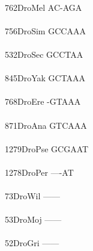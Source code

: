 \documentclass[11pt,twoside,reqno,a4paper]{article}
\begin{document}
{\\
762\hspace*{2\charwidth}DroMel	AC-AGA\\
\hspace*{5\charwidth}\hspace*{7\charwidth}\\
756\hspace*{2\charwidth}DroSim	GCCAAA\\
\hspace*{5\charwidth}\hspace*{7\charwidth}\\
532\hspace*{2\charwidth}DroSec	GCCTAA\\
\hspace*{5\charwidth}\hspace*{7\charwidth}\\
845\hspace*{2\charwidth}DroYak	GCTAAA\\
\hspace*{5\charwidth}\hspace*{7\charwidth}\\
768\hspace*{2\charwidth}DroEre	-GTAAA\\
\hspace*{5\charwidth}\hspace*{7\charwidth}\\
871\hspace*{2\charwidth}DroAna	GTCAAA\\
\hspace*{5\charwidth}\hspace*{7\charwidth}\\
1279\hspace*{1\charwidth}DroPse	GCGAAT\\
\hspace*{5\charwidth}\hspace*{7\charwidth}\\
1278\hspace*{1\charwidth}DroPer	----AT\\
\hspace*{5\charwidth}\hspace*{7\charwidth}\\
73\hspace*{3\charwidth}DroWil	------\\
\hspace*{5\charwidth}\hspace*{7\charwidth}\\
53\hspace*{3\charwidth}DroMoj	------\\
\hspace*{5\charwidth}\hspace*{7\charwidth}\\
52\hspace*{3\charwidth}DroGri	------\\
\hspace*{5\charwidth}\hspace*{7\charwidth}\\
\\
}
\end{document}
